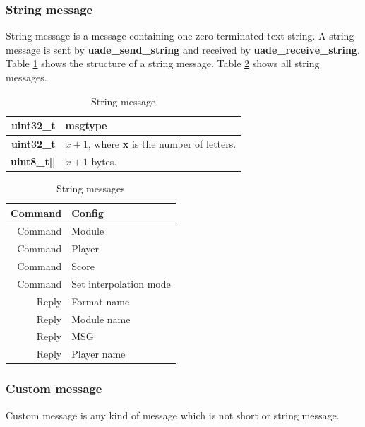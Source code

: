 \documentclass{article}
\begin{document}
\subsubsection{String message}

String message is a message containing one zero-terminated text string.
A string message is sent by \textbf{uade\_send\_string} and received by
\textbf{uade\_receive\_string}. Table \ref{tab:string_message} shows
the structure of a string message. Table \ref{tab:string_messages} shows
all string messages.

\begin{table}
\begin{center}
\caption{String message}
\label{tab:string_message}
\begin{tabular}{|r|l|}
\hline
\textbf{uint32\_t} & msgtype \\
\hline
\textbf{uint32\_t} & $x + 1$, where \textbf{x} is the number of letters.\\
\hline
\textbf{uint8\_t[]} & $x + 1$ bytes.\\
\hline
\end{tabular}
\end{center}
\end{table}

\begin{table}
\begin{center}
\caption{String messages}
\label{tab:string_messages}
\begin{tabular}{|r|l|}
\hline
Command & Config\\
\hline
Command & Module\\
\hline
Command & Player\\
\hline
Command & Score\\
\hline
Command & Set interpolation mode\\
\hline
Reply & Format name\\
\hline
Reply & Module name\\
\hline
Reply & MSG\\
\hline
Reply & Player name\\
\hline
\end{tabular}
\end{center}
\end{table}

\subsubsection{Custom message}

Custom message is any kind of message which is not short or string message.
\end{document}
